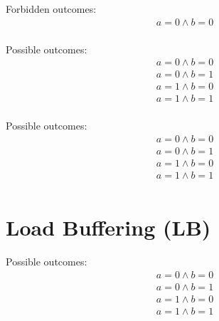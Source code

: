 \begin{minipage}[t]{0.3\linewidth}
Forbidden outcomes:\\
\[\begin{array}{l}
a = 0 \land b = 0\\
\end{array}\]
\end{minipage}
%
\sbTemplate{\sco}{\sco}{\sco}{\sco}{\sco}{\sco}
\litmusTestEnd

\begin{minipage}[t]{0.3\linewidth}
Possible outcomes:\\
\[\begin{array}{l}
a = 0 \land b = 0\\
a = 0 \land b = 1\\
a = 1 \land b = 0\\
a = 1 \land b = 1\\
\end{array}\]
\end{minipage}
%
\sbTemplate{\sco}{\sco}{\rel}{\sco}{\sco}{\sco}
\litmusTestEnd

\begin{minipage}[t]{0.3\linewidth}
Possible outcomes:\\
\[\begin{array}{l}
a = 0 \land b = 0\\
a = 0 \land b = 1\\
a = 1 \land b = 0\\
a = 1 \land b = 1\\
\end{array}\]
\end{minipage}
%
\sbTemplate{\sco}{\sco}{\sco}{\acq}{\sco}{\sco}
\litmusTestEnd


\section{Load Buffering (LB)}
\label{app:lb}

\begin{minipage}[t]{0.3\linewidth}
Possible outcomes:\\
\[\begin{array}{l}
a = 0 \land b = 0\\
a = 0 \land b = 1\\
a = 1 \land b = 0\\
a = 1 \land b = 1\\
\end{array}\]
\end{minipage}
%
\lbTemplate{\rlx}{\rlx}{\rlx}{\rlx}{\rlx}{\rlx}
\litmusTestEnd

